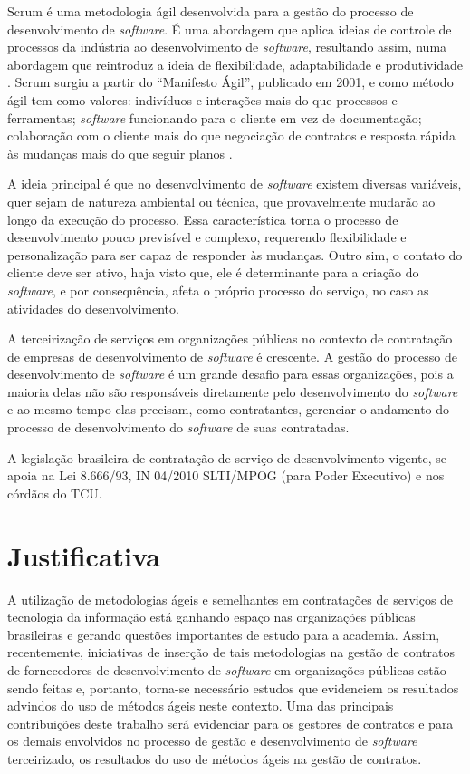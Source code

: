 Scrum é uma metodologia ágil desenvolvida para a gestão do processo de desenvolvimento de \textit{software}. É uma abordagem que aplica ideias de controle de processos da indústria ao desenvolvimento de \textit{software}, resultando assim, numa abordagem que reintroduz a ideia de flexibilidade, adaptabilidade e produtividade \cite{porto}. Scrum surgiu a partir do “Manifesto Ágil”, publicado em 2001, e como método ágil tem como valores: indivíduos e interações mais do que processos e ferramentas; \textit{software} funcionando para o cliente em vez de documentação; colaboração com o cliente mais do que negociação de contratos e resposta rápida às mudanças mais do que seguir planos \cite{manifesto}. 

A ideia principal é que no desenvolvimento de \textit{software} existem diversas variáveis, quer sejam de natureza ambiental ou técnica, que provavelmente mudarão ao longo da execução do processo. Essa característica torna o processo de desenvolvimento pouco previsível e complexo, requerendo flexibilidade e personalização para ser capaz de responder às mudanças. Outro sim, o contato do cliente deve ser ativo, haja visto que, ele é determinante para a criação do \textit{software}, e por consequência, afeta o próprio processo do serviço, no caso as atividades do desenvolvimento.

A terceirização de serviços em organizações públicas no contexto de contratação de empresas de desenvolvimento de \textit{software} é crescente. A gestão do processo de desenvolvimento de \textit{software} é um grande desafio para essas organizações, pois a maioria delas não são responsáveis diretamente pelo desenvolvimento do \textit{software} e ao mesmo tempo elas precisam, como contratantes, gerenciar o andamento do processo de desenvolvimento do \textit{software} de suas contratadas. 

A legislação brasileira de contratação de serviço de desenvolvimento vigente, se apoia na Lei 8.666/93, IN 04/2010 SLTI/MPOG (para Poder Executivo) e nos córdãos do TCU.



\section[Justificativa]{Justificativa}

A utilização de metodologias ágeis e semelhantes em contratações de serviços de tecnologia da informação está ganhando espaço nas organizações públicas brasileiras e gerando questões importantes de estudo para a academia. Assim, recentemente, iniciativas de inserção de tais metodologias na gestão de contratos de fornecedores de desenvolvimento de \textit{software} em organizações públicas estão sendo feitas e, portanto, torna-se necessário estudos que evidenciem os resultados advindos do uso de métodos ágeis neste contexto. Uma das principais contribuições deste trabalho será evidenciar para os gestores de contratos e para os demais envolvidos no processo de gestão e desenvolvimento de \textit{software} terceirizado, os resultados do uso de métodos ágeis na gestão de contratos. 

